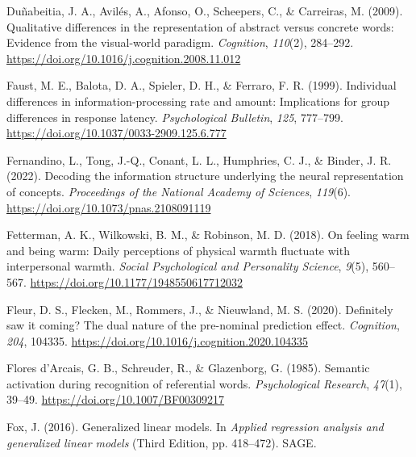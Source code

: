 \documentclass[
  12pt,
  man,floatsintext]{apa7}
\newlength{\cslhangindent}
\newlength{\cslentryspacingunit} %
\newenvironment{CSLReferences}[2] %
 {%
  \setlength{\parindent}{0pt}
  \ifodd #1
  \let\oldpar\par
  \def\par{\hangindent=\cslhangindent\oldpar}
  \fi
  \setlength{\parskip}{#2\cslentryspacingunit}
 }%
 {}
\begin{document}
\begin{CSLReferences}{1}{0}
\leavevmode{}%
Duñabeitia, J. A., Avilés, A., Afonso, O., Scheepers, C., \& Carreiras, M. (2009). Qualitative differences in the representation of abstract versus concrete words: {Evidence} from the visual-world paradigm. \emph{Cognition}, \emph{110}(2), 284--292. \url{https://doi.org/10.1016/j.cognition.2008.11.012}

\leavevmode{}%
Faust, M. E., Balota, D. A., Spieler, D. H., \& Ferraro, F. R. (1999). Individual differences in information-processing rate and amount: {Implications} for group differences in response latency. \emph{Psychological Bulletin}, \emph{125}, 777--799. \url{https://doi.org/10.1037/0033-2909.125.6.777}

\leavevmode{}%
Fernandino, L., Tong, J.-Q., Conant, L. L., Humphries, C. J., \& Binder, J. R. (2022). Decoding the information structure underlying the neural representation of concepts. \emph{Proceedings of the National Academy of Sciences}, \emph{119}(6). \url{https://doi.org/10.1073/pnas.2108091119}

\leavevmode{}%
Fetterman, A. K., Wilkowski, B. M., \& Robinson, M. D. (2018). On feeling warm and being warm: {Daily} perceptions of physical warmth fluctuate with interpersonal warmth. \emph{Social Psychological and Personality Science}, \emph{9}(5), 560--567. \url{https://doi.org/10.1177/1948550617712032}

\leavevmode{}%
Fleur, D. S., Flecken, M., Rommers, J., \& Nieuwland, M. S. (2020). Definitely saw it coming? {The} dual nature of the pre-nominal prediction effect. \emph{Cognition}, \emph{204}, 104335. \url{https://doi.org/10.1016/j.cognition.2020.104335}

\leavevmode{}%
Flores d'Arcais, G. B., Schreuder, R., \& Glazenborg, G. (1985). Semantic activation during recognition of referential words. \emph{Psychological Research}, \emph{47}(1), 39--49. \url{https://doi.org/10.1007/BF00309217}

\leavevmode{}%
Fox, J. (2016). Generalized linear models. In \emph{Applied regression analysis and generalized linear models} (Third Edition, pp. 418--472). {SAGE}.


\end{CSLReferences}
\end{document}
